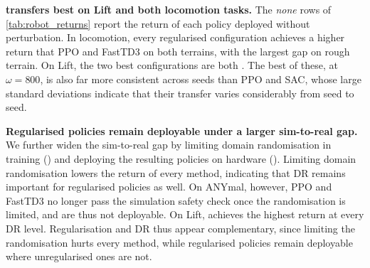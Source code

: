 

\textbf{\ourMethod transfers best on Lift and both locomotion tasks.}
The \textit{none} rows of \autoref{tab:robot_returns} report the return of each policy deployed without perturbation. In locomotion, every regularised configuration achieves a higher return that PPO and FastTD3 on both terrains, with the largest gap on rough terrain. 
On Lift, the two best configurations are both \ourMethod.
The best of these, at $\omega=800$, is also far more consistent across seeds than PPO and SAC, whose large standard deviations indicate that their transfer varies considerably from seed to seed.

\textbf{Regularised policies remain deployable under a larger sim-to-real gap.}
We further widen the sim-to-real gap by limiting domain randomisation in training () and deploying the resulting policies on hardware ().
Limiting domain randomisation lowers the return of every method, indicating that DR remains important for regularised policies as well.
On ANYmal, however, PPO and FastTD3 no longer pass the simulation safety check once the randomisation is limited, and are thus not deployable.
On Lift, \ourMethod achieves the highest return at every DR level.
Regularisation and DR thus appear complementary, since limiting the randomisation hurts every method, while regularised policies remain deployable where unregularised ones are not.

